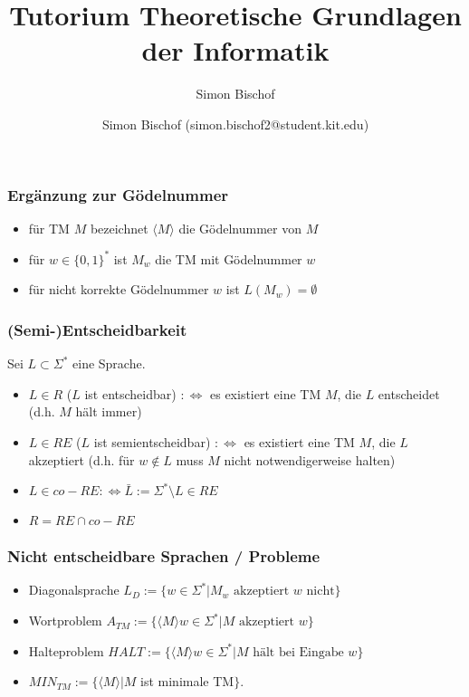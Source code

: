 \documentclass{beamer}
\author{Simon Bischof (simon.bischof2@student.kit.edu)}
\title{Tutorium Theoretische Grundlagen der Informatik}
\subtitle{Simon Bischof}
\institute{Institut f\"{u}r Kryptographie und Sicherheit}
\newcommand{\F}{\Sigma^*}
\begin{document}
\begin{frame}
\maketitle
\end{frame}

\begin{frame}
\frametitle{Ergänzung zur Gödelnummer}
\begin{itemize}
\item für TM $M$ bezeichnet $\langle M\rangle$ die Gödelnummer von $M$
\item für $w\in\{0,1\}^*$ ist $M_w$ die TM mit Gödelnummer $w$ \pause
\item für nicht korrekte Gödelnummer $w$ ist $L(M_w)=\emptyset$
\end{itemize}
\end{frame}

\begin{frame}
\frametitle{(Semi-)Entscheidbarkeit}
Sei $L\subset\F$ eine Sprache.
\begin{itemize}
\item $L\in R$ ($L$ ist entscheidbar) $:\Leftrightarrow$ es existiert eine TM $M$, die $L$ entscheidet (d.h. $M$ hält immer) \pause
\item $L\in RE$ ($L$ ist semientscheidbar) $:\Leftrightarrow$ es existiert eine TM $M$, die $L$ akzeptiert (d.h. für $w\notin L$ muss $M$ nicht notwendigerweise halten)
\item $L\in co-RE :\Leftrightarrow \bar{L} := \F\setminus L\in RE$
\item $R=RE\cap co-RE$
\end{itemize}
\end{frame}

\begin{frame}
\frametitle{Nicht entscheidbare Sprachen / Probleme}
\begin{itemize}
\item Diagonalsprache $L_D:=\{w\in\F | M_w \text{ akzeptiert } w \text{ nicht}\}$
\item Wortproblem $A_{TM}:=\{\langle M\rangle w\in\F | M \text{ akzeptiert } w\}$
\item Halteproblem $HALT:=\{\langle M\rangle w\in\F | M \text{ hält bei Eingabe } w\}$
\item $MIN_{TM} := \{\langle M\rangle | M$ ist minimale TM$\}$.
\end{itemize}
\end{frame}
\end{document}
